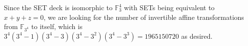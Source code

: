 Since the SET deck is isomorphic to $\mathbb{F}_3^4$ with SETs being equivalent to $x+y+z=0$, we are looking for the number of invertible affine transformations from $\mathbb{F}_{3^4}$ to itself, which is $3^4\left(3^4-1\right)\left(3^4-3\right)\left(3^4-3^2\right)\left(3^4-3^3\right)=\boxed{1965150720}$ as desired.
